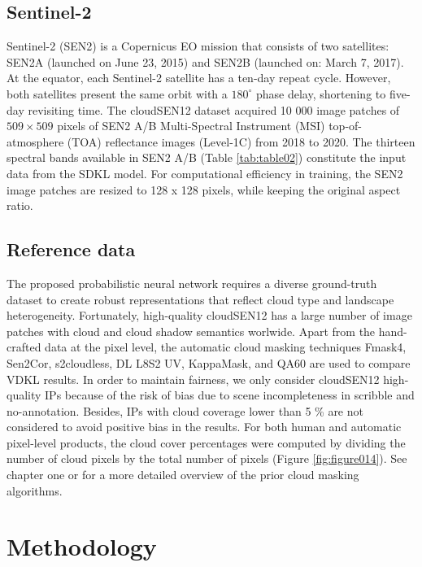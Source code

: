 \documentclass[a4paper, nobind]{templates/cdethesis}
\begin{document}
\subsection{Sentinel-2}

Sentinel-2 (SEN2) is a Copernicus EO mission that consists of two satellites: SEN2A (launched on June 23, 2015) and SEN2B (launched on: March 7, 2017). At the equator, each Sentinel-2 satellite has a ten-day repeat cycle. However, both satellites present the same orbit with a \(180^\circ\) phase delay, shortening to five-day revisiting time. The cloudSEN12 dataset acquired 10 000 image patches of \(509 \times 509\) pixels of SEN2 A/B Multi-Spectral Instrument (MSI) top-of-atmosphere (TOA) reflectance images (Level-1C) from 2018 to 2020. The thirteen spectral bands available in SEN2 A/B (Table \ref{tab:table02}) constitute the input data from the SDKL model. For computational efficiency in training, the SEN2 image patches are resized to 128 x 128 pixels, while keeping the original aspect ratio.

\subsection{Reference data} 
\label{section:ref_data}

The proposed probabilistic neural network requires a diverse ground-truth dataset to create robust representations that reflect cloud type and landscape heterogeneity. Fortunately, high-quality cloudSEN12 has a large number of image patches with cloud and cloud shadow semantics worlwide. Apart from the hand-crafted data at the pixel level, the automatic cloud masking techniques Fmask4, Sen2Cor, s2cloudless, DL L8S2 UV, KappaMask, and QA60 are used to compare VDKL results. In order to maintain fairness, we only consider cloudSEN12 high-quality IPs because of the risk of bias due to scene incompleteness in scribble and no-annotation. Besides, IPs with cloud coverage lower than 5 \% are not considered to avoid positive bias in the results. For both human and automatic pixel-level products, the cloud cover percentages were computed by dividing the number of cloud pixels by the total number of pixels (Figure \ref{fig:figure014}). See chapter one or \cite{CMIXRSE22} for a more detailed overview of the prior cloud masking algorithms.

\hypertarget{methodology}{%
\section{Methodology}\label{methodology}}
\end{document}
